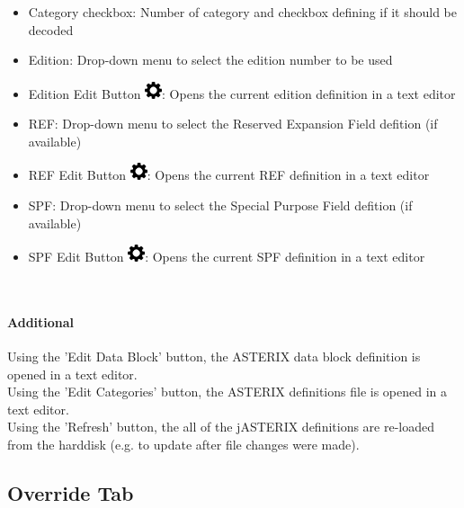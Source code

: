 \begin{itemize}  
\item Category checkbox: Number of category and checkbox defining if it should be decoded
\item Edition: Drop-down menu to select the edition number to be used
\item Edition Edit Button \includegraphics[width=0.5cm]{../../data/icons/edit.png}: Opens the current edition definition in a text editor
\item REF: Drop-down menu to select the Reserved Expansion Field defition (if available)
\item REF Edit Button \includegraphics[width=0.5cm]{../../data/icons/edit.png}: Opens the current REF definition in a text editor
\item SPF: Drop-down menu to select the Special Purpose Field defition (if available)
\item SPF Edit Button \includegraphics[width=0.5cm]{../../data/icons/edit.png}: Opens the current SPF definition in a text editor
\end{itemize}
\ \\

\paragraph{Additional}

Using the 'Edit Data Block' button, the ASTERIX data block definition is opened in a text editor. \\

Using the 'Edit Categories' button, the ASTERIX definitions file is opened in a text editor. \\

Using the 'Refresh' button, the all of the jASTERIX definitions are re-loaded from the harddisk (e.g. to update after file changes were made). \\

\subsection{Override Tab}
\label{sec:task_import_asterix_override}


